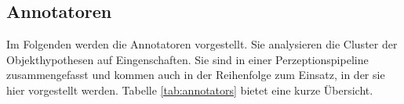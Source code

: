 %
%
%
%


\subsection{Annotatoren}

Im Folgenden werden die Annotatoren vorgestellt. Sie analysieren die Cluster der Objekthypothesen auf Eingenschaften.  Sie sind in einer Perzeptionspipeline zusammengefasst und kommen auch in der Reihenfolge zum Einsatz, in der sie hier vorgestellt werden. Tabelle \ref{tab:annotators} bietet eine kurze Übersicht.

